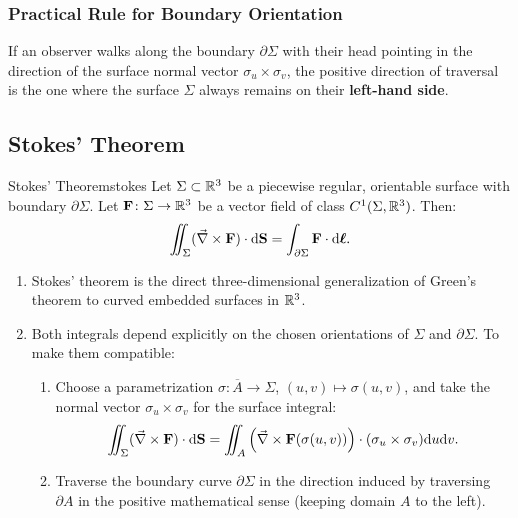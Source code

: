 \subsubsection*{Practical Rule for Boundary Orientation}
\begin{remarque}
If an observer walks along the boundary $\partial \Sigma$ with their head pointing in the direction of the surface normal vector $\sigma_u \times \sigma_v$, the positive direction of traversal is the one where the surface $\Sigma$ always remains on their \textbf{left-hand side}.
\end{remarque}

\subsection{Stokes' Theorem}

\begin{theoreme}{Stokes' Theorem}{stokes}
Let $\Sigma \subset \mathbb{R}^3$ be a piecewise regular, orientable surface with boundary $\partial \Sigma$. Let $\mathbf{F} \colon \Sigma \to \mathbb{R}^3$ be a vector field of class $C^1(\Sigma, \mathbb{R}^3)$. Then:
\begin{equation}
    \iint_{\Sigma} (\vec{\nabla}\times \mathbf{F}) \cdot \mathrm{d}\mathbf{S} = \int_{\partial \Sigma} \mathbf{F} \cdot \mathrm{d}\bm{\ell}.
\end{equation}
\end{theoreme}

\begin{remarque}
\leavevmode
\begin{enumerate}[label=\alph*)]
    \item Stokes' theorem is the direct three-dimensional generalization of Green's theorem to curved embedded surfaces in $\mathbb{R}^3$.
    \item Both integrals depend explicitly on the chosen orientations of $\Sigma$ and $\partial \Sigma$. To make them compatible:
    \begin{enumerate}[label=\roman*)]
        \item Choose a parametrization $\sigma \colon \overline{A} \to \Sigma$, $(u,v) \mapsto \sigma(u,v)$, and take the normal vector $\sigma_u \times \sigma_v$ for the surface integral:
        \begin{equation}
            \iint_{\Sigma} (\vec{\nabla}\times \mathbf{F}) \cdot \mathrm{d}\mathbf{S} = \iint_{A} \left( \vec{\nabla}\times \mathbf{F}(\sigma(u,v)) \right) \cdot (\sigma_u \times \sigma_v) \mathrm{d} u \mathrm{d} v.
        \end{equation}
        \item Traverse the boundary curve $\partial \Sigma$ in the direction induced by traversing $\partial A$ in the positive mathematical sense (keeping domain $A$ to the left).
    \end{enumerate}
\end{enumerate}
\end{remarque}

